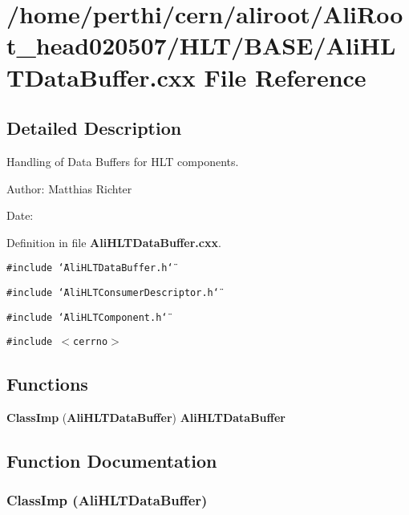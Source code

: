 \section{/home/perthi/cern/aliroot/Ali\-Root\_\-head020507/HLT/BASE/Ali\-HLTData\-Buffer.cxx File Reference}
\label{AliHLTDataBuffer_8cxx}


\subsection{Detailed Description}
Handling of Data Buffers for HLT components. 

\begin{Desc}
\item[Author:]Matthias Richter \end{Desc}
\begin{Desc}
\item[Date:]\end{Desc}


Definition in file {\bf Ali\-HLTData\-Buffer.cxx}.

{\tt \#include \char`\"{}Ali\-HLTData\-Buffer.h\char`\"{}}\par
{\tt \#include \char`\"{}Ali\-HLTConsumer\-Descriptor.h\char`\"{}}\par
{\tt \#include \char`\"{}Ali\-HLTComponent.h\char`\"{}}\par
{\tt \#include $<$cerrno$>$}\par
\subsection*{Functions}
\begin{CompactItemize}
\item 
{\bf Class\-Imp} ({\bf Ali\-HLTData\-Buffer}) {\bf Ali\-HLTData\-Buffer}
\end{CompactItemize}


\subsection{Function Documentation}
\subsubsection{\setlength{\rightskip}{0pt plus 5cm}Class\-Imp ({\bf Ali\-HLTData\-Buffer})}\label{AliHLTDataBuffer_8cxx_a0}


